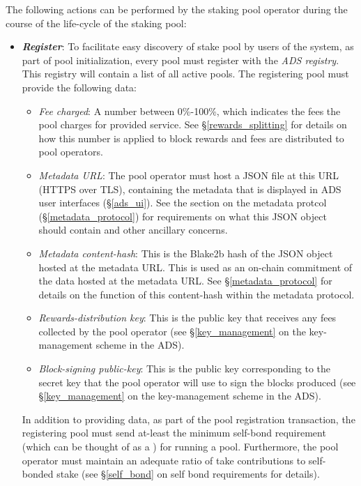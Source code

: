 The following actions can be performed by the staking pool operator during the course of the life-cycle of the staking pool: 
\begin{itemize}
    \item \textbf{\textit{Register}}: To facilitate easy discovery of stake pool by users of the system, as part of pool initialization, every pool must register with the \textit{ADS registry}. This registry will contain a list of all active pools. The registering pool must provide the following data: 
    \begin{itemize}
        \item \textit{Fee charged}: A number between 0\%-100\%, which indicates the fees the pool charges for provided service. See \S\ref{rewards_splitting} for details on how this number is applied to block rewards and fees are distributed to pool operators. 
        \item \textit{Metadata URL}: The pool operator must host a JSON file at this URL (HTTPS over TLS), containing the metadata that is displayed in ADS user interfaces (\S\ref{ads_ui}). See the section on the metadata protcol (\S\ref{metadata_protocol}) for requirements on what this JSON object should contain and other ancillary concerns. 
        \item \textit{Metadata content-hash}: This is the Blake2b hash of the JSON object hosted at the metadata URL. This is used as an on-chain commitment of the data hosted at the metadata URL. See \S\ref{metadata_protocol} for details on the function of this content-hash within the metadata protocol. 
        \item \textit{Rewards-distribution key}: This is the public key that receives any fees collected by the pool operator (see \S\ref{key_management} on the key-management scheme in the ADS). 
        \item \textit{Block-signing public-key}: This is the public key corresponding to the secret key that the pool operator will use to sign the blocks produced (see \S\ref{key_management} on the key-management scheme in the ADS). 
    \end{itemize}
    
    In addition to providing data, as part of the pool registration transaction, the registering pool must send at-least the minimum self-bond requirement (which can be thought of as a ) for running a pool. Furthermore, the pool operator must maintain an adequate ratio of take contributions to self-bonded stake (see \S\ref{self_bond} on self bond requirements for details).
    

\end{itemize}
